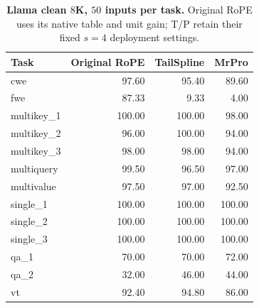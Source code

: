 \begin{table}[ht]
\centering\small
\caption{\textbf{Llama clean $8$K, $50$ inputs per task.} Original RoPE uses its native table and unit gain; T/P retain their fixed $s=4$ deployment settings.}
\label{tab:native-clean-new}
\begin{tabular}{@{}lrrr@{}}
\toprule
Task & Original RoPE & TailSpline & MrPro \\
\midrule
cwe & 97.60 & 95.40 & 89.60 \\
fwe & 87.33 & 9.33 & 4.00 \\
multikey\_1 & 100.00 & 100.00 & 98.00 \\
multikey\_2 & 96.00 & 100.00 & 94.00 \\
multikey\_3 & 98.00 & 98.00 & 94.00 \\
multiquery & 99.50 & 96.50 & 97.00 \\
multivalue & 97.50 & 97.00 & 92.50 \\
single\_1 & 100.00 & 100.00 & 100.00 \\
single\_2 & 100.00 & 100.00 & 100.00 \\
single\_3 & 100.00 & 100.00 & 100.00 \\
qa\_1 & 70.00 & 70.00 & 72.00 \\
qa\_2 & 32.00 & 46.00 & 44.00 \\
vt & 92.40 & 94.80 & 86.00 \\
\bottomrule
\end{tabular}
\end{table}

